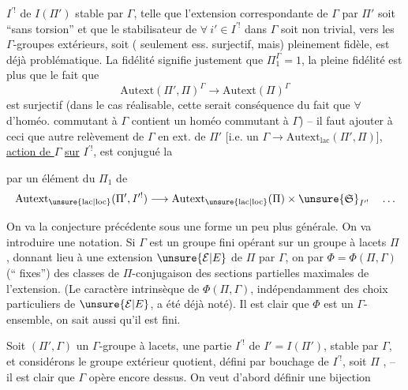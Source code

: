 $I^{\prime!}$ de $I(\Pi')$ stable par $\Gamma$, telle que l'extension correspondante de $\Gamma$ par $\Pi'$ soit ``sans torsion'' et que le stabilisateur de $\forall\ i'\in I^{\prime!}$ dans $\Gamma$ soit non trivial, vers les $\Gamma$-groupes extérieurs, soit ( seulement ess. surjectif, mais) pleinement fidèle, est déjà problématique. La fidélité signifie justement que $\Pi_1^\Gamma=1$, la pleine fidélité est plus  que le fait que 
\[
\mathrm{Autext}(\Pi',\Pi)^\Gamma\longrightarrow\mathrm{Autext}(\Pi)^\Gamma
\]
est surjectif (dans le cas réalisable, cette  serait conséquence du fait que $\forall$  d'homéo. commutant à $\Gamma$ contient un homéo commutant à $\Gamma$)
-- il faut ajouter à ceci que  autre relèvement de $\Gamma$ en  ext. de $\Pi'$ [i.e. un $\Gamma\longrightarrow\mathrm{Autext}_{\mathrm{lac}}(\Pi',\Pi)$\inserted{\diagram{[Sous le terme $\mathrm{Autext}_{\mathrm{lac}}(\Pi',\Pi)$, $\mathrm{Autext}_{\mathrm{lac}}(\Pi',I)$, relié au terme supérieur par un signe vertical \unsure{$=$|$\simeq$}.]}}],    \uline{action de $\Gamma$} \uline{sur} $I^{\prime!}$, est conjugué  la 

 par un élément du  $\Pi_1$ de
\[
\mathrm{Autext}_{\unsure{\mathrm{lac}|\mathrm{loc}}}(\Pi',I^{\prime!})
\longrightarrow
\mathrm{Autext}_{\unsure{\mathrm{lac}|\mathrm{loc}}}(\Pi)
\times \unsure{\mathfrak S}_{I^{\prime!}}\quad\ldots
\]

On va  la conjecture précédente sous une forme un peu plus générale.
On va introduire une notation. Si $\Gamma$ est un groupe fini opérant 
 sur un groupe à lacets $\Pi$ ,
donnant lieu à une extension $\unsure{\mathcal E|E}$ de $\Pi$ par $\Gamma$,
on   par $\Phi=\Phi(\Pi,\Gamma)$ (`` fixes'')
 des classes de $\Pi$-conjugaison des sections partielles
 maximales de l'extension.
(Le caractère intrinsèque de $\Phi(\Pi,\Gamma)$, indépendamment des choix particuliers de $\unsure{\mathcal E|E}$, a été déjà noté).
Il est clair que $\Phi$ est un $\Gamma$-ensemble, on sait aussi qu'il est fini.

Soit  $(\Pi',\Gamma)$ un $\Gamma$-groupe 
à lacets,   une partie
$I^{\prime!}$ de $I'=I(\Pi')$, stable par $\Gamma$,
et considérons le groupe extérieur quotient, défini par bouchage de $I^{\prime!}$,
soit $\Pi$ , -- il est clair que $\Gamma$ opère encore dessus.
On veut d'abord définir une bijection

